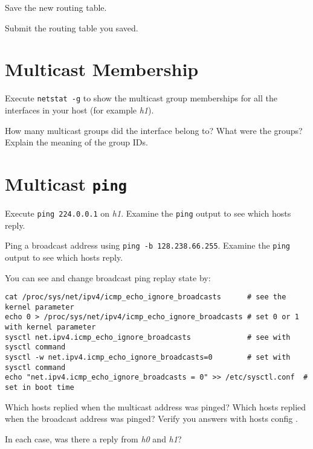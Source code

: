 \documentclass{../UTNetLab}
\begin{document}
    Save the new routing table.
    
    \begin{report}
        \item Submit the routing table you saved.
    \end{report}

\section{Multicast Membership}
    Execute \lstinline{netstat -g} to show the multicast group memberships for all the interfaces in your host (for example \textit{h1}).
    
    \begin{report}
        \item How many multicast groups did the interface belong to? What were the groups? Explain the meaning of the group IDs.
    \end{report}

\section{Multicast \texttt{ping}}
    Execute \lstinline{ping 224.0.0.1} on \textit{h1}.
    Examine the \lstinline{ping} output to see which hosts reply.

    Ping a broadcast address using \lstinline{ping -b 128.238.66.255}.
    Examine the \lstinline{ping} output to see which hosts reply.

    You can see and change broadcast ping replay state by:
    \begin{lstlisting}[emph=eth0]
cat /proc/sys/net/ipv4/icmp_echo_ignore_broadcasts      # see the kernel parameter
echo 0 > /proc/sys/net/ipv4/icmp_echo_ignore_broadcasts # set 0 or 1 with kernel parameter
sysctl net.ipv4.icmp_echo_ignore_broadcasts             # see with sysctl command
sysctl -w net.ipv4.icmp_echo_ignore_broadcasts=0        # set with sysctl command
echo "net.ipv4.icmp_echo_ignore_broadcasts = 0" >> /etc/sysctl.conf  # set in boot time
    \end{lstlisting}
    
    \begin{report}
        \item Which hosts replied when the multicast address was pinged?
            Which hosts replied when the broadcast address was pinged?
            Verify you answers with hosts config .

        \item In each case, was there a reply from \textit{h0} and \textit{h1}?
    \end{report}
\end{document}
